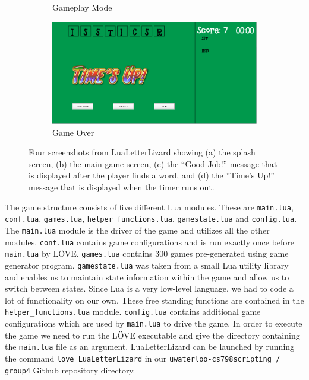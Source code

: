\begin{figure}
\begin{subfigure}{0.49\textwidth}
        \caption{Gameplay Mode}
        \label{luagameplay}
    \end{subfigure}
    \begin{subfigure}{0.49\textwidth}
        \includegraphics[width=\textwidth]{../screenshots/luagameover.png}
        \caption{Game Over}
        \label{luagameover}
    \end{subfigure}
    \caption[Four screenshots from the Letter Lizard Lua implementation]
    {Four screenshots from LuaLetterLizard showing (a) the splash screen, (b) the     
    main game screen, (c) the ``Good Job!'' message that is displayed after the player
    finds a word, and (d) the ''Time's Up!'' message that is displayed when
    the timer runs out.}
    \label{luascreenshots1}
\end{figure}

The game structure consists of five different Lua modules. These are \texttt{main.lua}, \texttt{conf.lua}, \texttt{games.lua},  \texttt{helper\_functions.lua}, \texttt{gamestate.lua} and \texttt{config.lua}. 
The \texttt{main.lua} module is the driver of the game and utilizes all the other modules. \texttt{conf.lua} contains game configurations and is run exactly once before \texttt{main.lua} by L\"OVE. \texttt{games.lua} contains 300 games pre-generated using game generator program. \texttt{gamestate.lua} was taken from  a small Lua utility library and enables us to maintain state information within the game and allow us to switch between states. Since Lua is a very low-level language, we had to code a lot of functionality on our own. These free standing functions are contained in the \texttt{helper\_functions.lua} module. \texttt{config.lua} contains additional game configurations which are used by \texttt{main.lua} to drive the game. In order to execute the game we need to run the L\"OVE executable and give the directory containing the \texttt{main.lua} file as an argument. LuaLetterLizard can be launched by running the command \texttt{love LuaLetterLizard} in our \texttt{uwaterloo-cs798scripting / group4} Github repository directory.
	
